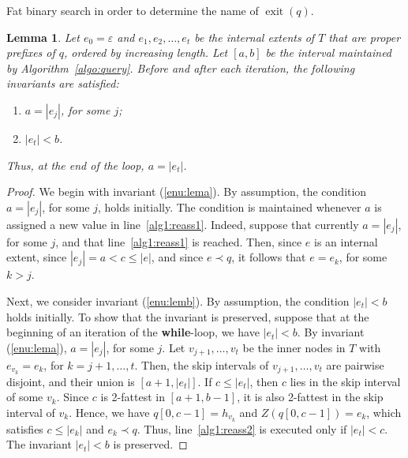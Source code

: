 \documentclass[a4paper,11pt]{article}
\newtheorem{lemma}[theorem]{Lemma}
\newcommand{\eps}{\varepsilon}
\newcommand{\?}{\mskip1.5mu}
\DeclareMathOperator{\exit}{exit}
\begin{document}
\begin{algorithm}
\KwOut{the name of $\exit(q)$}
\If{$a = 0 \wedge e_\text{root}\neq\eps$}{%
  \Return $\eps$\;
} 
\caption{Fat binary search in order to 
  determine the name of $\exit(q)$.}
\label{algo:query}
\end{algorithm}

\begin{lemma}\label{lem:correctness}
Let $e_0 = \eps$ and $e_1, e_2, \dots, e_t$ be the internal 
extents of $T$ that are \emph{proper} prefixes of $q$, ordered by 
increasing length.  Let $[a, b]$ be the interval maintained by 
Algorithm~\ref{algo:query}. Before and after each iteration, the 
following invariants are satisfied: 
\begin{enumerate}
    \item\label{enu:lema} $a = |e_j|$, for some $j$;
    \item\label{enu:lemb} $|e_t|< b$.
\end{enumerate}
Thus, at the end of the loop, $a = |e_t|$.
\end{lemma}

\begin{proof}
We begin with invariant (\ref{enu:lema}).
By assumption, the condition $a = |e_j|$, for some $j$, holds
initially. The condition is maintained whenever
$a$ is assigned a new value in line~\ref{alg1:reass1}. 
Indeed, suppose that currently $a = |e_j|$, for some $j$, and
that line~\ref{alg1:reass1} is reached. Then, since $e$ is an 
internal extent, since $|e_j| = a  < c  \leq |e|$, 
and since $e \prec q$, it follows that $e = e_k$, for some $k > j$.

Next, we consider invariant (\ref{enu:lemb}).
By assumption, the condition $|e_t| < b$ holds initially.
To show that the invariant is preserved,
suppose that at the beginning of an iteration of the
\textbf{while}-loop, we have $|e_t| < b$.
By invariant (\ref{enu:lema}), $a = |e_j|$, for some $j$.  
Let $v_{j+1}, \dots, v_{t}$ be the inner nodes in $T$ 
with $e_{v_k} = e_k$, for $k = j + 1, \dots, t$.
Then, the skip intervals of $v_{j+1}, \dots, v_t$ are 
pairwise disjoint, and their union is $[a + 1, |e_t|]$.
If $c \leq |e_t|$, then $c$ lies in the
skip interval of some $v_k$.
Since $c$ is 2-fattest in $[a + 1, b - 1]$, 
it is also 2-fattest in the skip interval of $v_k$. 
Hence, we have $q[0, c - 1] = h_{v_k}$ and 
$Z(q[0, c - 1]) = e_k$, 
which satisfies $c \leq |e_k|$ and $e_k  \prec q$. 
Thus, line~\ref{alg1:reass2} is executed only if $|e_t| < c$.
The invariant $|e_t| < b$ is preserved.
\end{proof}
\end{document}
